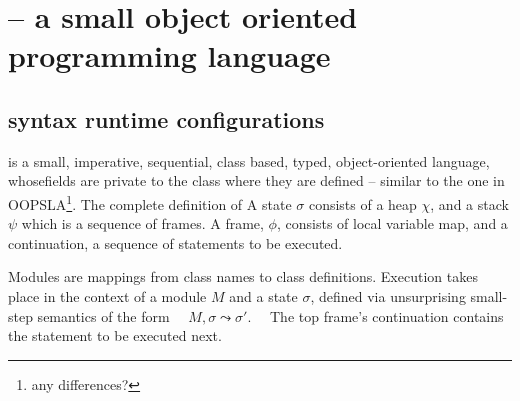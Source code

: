  \newcommand{\atom}{atom\xspace}
 \newcommand{\atoms}{atoms\xspace}  
 \newcommand{\pushSymbol}{{\vartriangleright}}
\newcommand{\Push}[4] {\ensuremath{(\overline{#1 \mapsto #2}, #3) \pushSymbol #4}}
\newcommand{\Pushes}[2] {\ensuremath{(\overline{#1}) \pushSymbol #2}}
\newcommand{\va}{\ensuremath{\upsilon}}

 
\section{\LangOO -- a small  object oriented programming language}

\subsection{\LangOO syntax runtime configurations}
\label{sub:Loo} 
 \LangOO  is a {small}, imperative, sequential,  class based, typed, object-oriented language, whosefields are private to the class where they are defined -- similar to the one in OOPSLA\footnote{any differences?}.
The complete definition of 
A \LangOO state $\sigma$ consists of a  heap $\chi$, and a  {stack $\psi$ which is a sequence of frames}.
A frame, $\phi$, consists of local variable map, and a continuation, \ie a sequence of statements to be executed.
 
Modules are mappings from class names to class definitions. 
Execution takes place in the context of  a module $M$ and   a state $\sigma$, defined via unsurprising small-step semantics of the form \ \ 
   $M, \sigma \leadsto \sigma'$. \ \
The   top frame's continuation contains the statement to be  executed next.  



